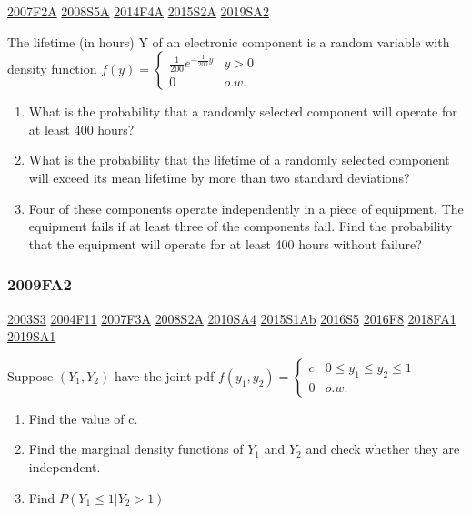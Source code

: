\documentclass[10pt,twocolumn,portrait]{article}
\begin{document}
\protect\hyperlink{f2a}{2007F2A} \protect\hyperlink{s5a}{2008S5A}
\protect\hyperlink{f4a-1}{2014F4A} \protect\hyperlink{s2a-1}{2015S2A}
\protect\hyperlink{sa2-3}{2019SA2}

The lifetime (in hours) Y of an electronic component is a random
variable with density function
\(f(y)=\begin{cases}\frac1{200}e^{-\frac1{200}y}& y>0\\0& o.w.\end{cases}\)

\begin{enumerate}
\def\labelenumi{(\alph{enumi})}
\item
  What is the probability that a randomly selected component will
  operate for at least 400 hours?
\item
  What is the probability that the lifetime of a randomly selected
  component will exceed its mean lifetime by more than two standard
  deviations?
\item
  Four of these components operate independently in a piece of
  equipment. The equipment fails if at least three of the components
  fail. Find the probability that the equipment will operate for at
  least 400 hours without failure?
\end{enumerate}

\hypertarget{fa2}{%
\subsubsection{2009FA2}\label{fa2}}

\protect\hyperlink{s3}{2003S3} \protect\hyperlink{f11}{2004F11}
\protect\hyperlink{f3a}{2007F3A} \protect\hyperlink{s2a}{2008S2A}
\protect\hyperlink{sa4-1}{2010SA4} \protect\hyperlink{s1ab}{2015S1Ab}
\protect\hyperlink{s5-4}{2016S5} \protect\hyperlink{f8-4}{2016F8}
\protect\hyperlink{fa1-4}{2018FA1} \protect\hyperlink{sa1-3}{2019SA1}

Suppose \((Y_1,Y_2)\) have the joint pdf
\(f(y_1,y_2)=\begin{cases}c&0\le y_1\le y_2\le 1\\0& o.w.\end{cases}\)

\begin{enumerate}
\def\labelenumi{(\alph{enumi})}
\item
  Find the value of c.
\item
  Find the marginal density functions of \(Y_1\) and \(Y_2\) and check
  whether they are independent.
\item
  Find \(P(Y_1\le1|Y_2>1)\)
\end{enumerate}
\end{document}

